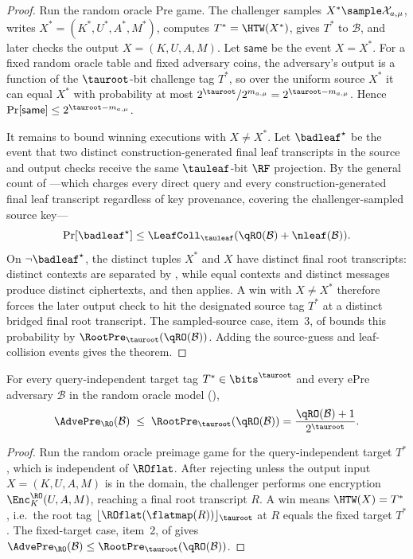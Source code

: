 \begin{proof}
Run the random oracle Pre game. The challenger samples
$X^* \sample \mathcal{X}_{a,\mu}$, writes
$X^*=(K^*,U^*,A^*,M^*)$, computes $T^*=\HTW(X^*)$, gives $T^*$ to
$\mathcal{B}$, and later checks the output $X=(K,U,A,M)$. Let
$\mathsf{same}$ be the event $X=X^*$. For a
fixed random oracle table and fixed adversary coins, the adversary's output
is a function of the $\tauroot$-bit challenge tag $T^*$, so over the
uniform source $X^*$ it can equal $X^*$ with probability at most
$2^{\tauroot}/2^{m_{a,\mu}}=2^{\tauroot-m_{a,\mu}}$. Hence
$\Pr[\mathsf{same}] \leq 2^{\tauroot-m_{a,\mu}}$.

It remains to bound winning executions with $X \neq X^*$. Let
$\badleaf^\star$ be the event that two distinct construction-generated
final leaf transcripts in the source and output checks receive the same
$\tauleaf$-bit $\RF$ projection. By the general count of
---which charges every direct query and every
construction-generated final leaf transcript regardless of key
provenance, covering the challenger-sampled source key---
\[
  \Pr[\badleaf^\star]
  \leq
  \LeafColl_{\tauleaf}(\qRO(\mathcal{B})+\nleaf(\mathcal{B})).
\]
On $\neg\badleaf^\star$, the distinct tuples $X^*$ and $X$ have distinct
final root transcripts: distinct contexts are separated by
, while equal contexts and distinct messages produce
distinct ciphertexts, and then  applies. A win
with $X \neq X^*$ therefore forces the later output check to hit the
designated source tag $T^*$ at a distinct bridged final root transcript.
The sampled-source case, item~3, of  bounds this
probability by $\RootPre_{\tauroot}(\qRO(\mathcal{B}))$. Adding the
source-guess and leaf-collision events gives the theorem.
\end{proof}

\begin{theorem}
\label{thm:epre-ro}
For every query-independent target tag $T^* \in \bits^{\tauroot}$ and
every ePre adversary $\mathcal{B}$ in the \TW{}
random oracle model (),
\[
  \AdvePre_\RO(\mathcal{B})
  \;\leq\; \RootPre_{\tauroot}(\qRO(\mathcal{B}))
  = \frac{\qRO(\mathcal{B}) + 1}{2^{\tauroot}}.
\]
\end{theorem}

\begin{proof}
Run the random oracle preimage game for the query-independent target
$T^*$, which is independent of $\ROflat$. After rejecting unless the
output input $X = (K,U,A,M)$ is in the \TW{} domain, the challenger
performs one encryption $\Enc_{K}^\RO(U,A,M)$, reaching a final root
transcript $R$. A win means $\HTW(X) = T^*$, i.e.\ the root tag
$\lfloor \ROflat(\flatmap(R)) \rfloor_{\tauroot}$ at $R$ equals the fixed
target $T^*$. The fixed-target case, item~2, of
 gives
$\AdvePre_\RO(\mathcal{B}) \leq \RootPre_{\tauroot}(\qRO(\mathcal{B}))$.
\end{proof}

